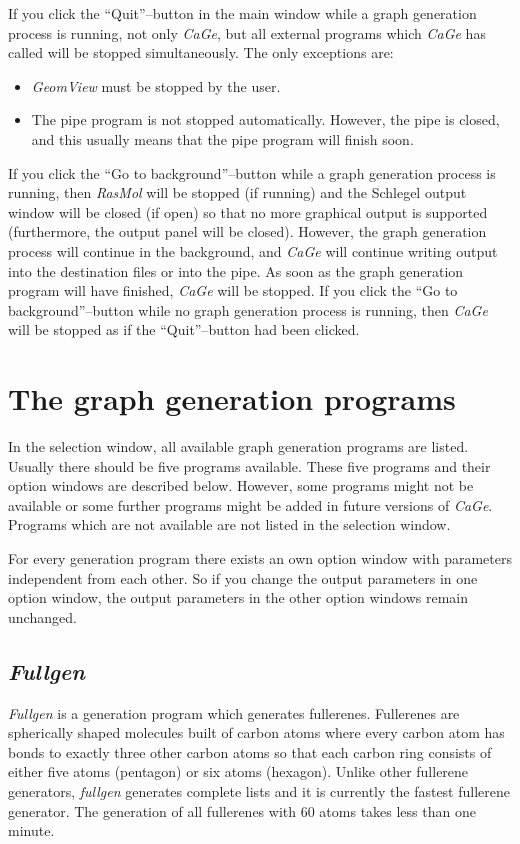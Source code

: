 \documentclass[a4paper]{article}
\def\CaGe{\textit{CaGe}}
\begin{document}
If you click 
the ``Quit''--button in the main window while a graph generation
process is running,
not only \CaGe{}, but all external programs which \CaGe{} has called will be
stopped simultaneously. The only exceptions are:
\begin{itemize}
\item \textit{GeomView} must be stopped by the user.  
\item The pipe program is not stopped automatically. However, the pipe is
      closed, and this usually means that the pipe program will finish soon.
\end{itemize}
If you click
 the ``Go to background''--button while a graph generation process
is running, then \textit{RasMol} will be stopped (if running) and the Schlegel 
output window will be closed (if open) so that no more graphical output is 
supported (furthermore, the output panel will be closed). However, the graph
generation process will continue in the background, and \CaGe{} will continue
writing output into the destination files or into the pipe. As soon as the
graph generation program will have finished, \CaGe{} will be stopped. 
If you click
 the ``Go to background''--button while no graph generation process
is running, then \CaGe{} will be stopped as if the ``Quit''--button had been
clicked.

\section{The graph generation programs}

In the selection window, all available graph generation programs are listed.
Usually there should be five programs available. These five programs and their
option windows are
described below. However, some programs might not be available or some further
programs might be added in future versions of \CaGe{}. Programs which are not
available are not listed in the selection window.

For every generation program there exists an own option window with parameters
independent from each other. So if you change the output parameters in one
option window, the output parameters in the other option windows remain 
unchanged.

\subsection{\label{fullgen}\textit{Fullgen}}

\textit{Fullgen} is a generation program which generates fullerenes. Fullerenes
are spherically shaped molecules built of carbon atoms where every carbon
atom has bonds to exactly three other carbon atoms so that each carbon ring
consists of either five atoms (pentagon) or six atoms (hexagon). Unlike other 
fullerene generators, \textit{fullgen} generates complete lists and it is 
currently the fastest fullerene generator. The generation of all fullerenes
with 60 atoms takes less than one minute.
\end{document}
